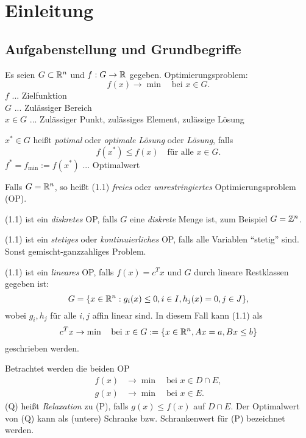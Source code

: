 \section{Einleitung}
\subsection{Aufgabenstellung und Grundbegriffe}
Es seien $G \subset \mathbb{R}^n$ und $f: G \to \mathbb{R}$ gegeben. Optimierungsproblem:
\begin{equation}
  f(x) \to \min \quad \text{bei } x \in G.
\end{equation}
$f$ ... Zielfunktion \\
$G$ ... Zulässiger Bereich \\
$x \in G$ ... Zulässiger Punkt, zulässiges Element, zulässige Lösung

$x^* \in G$  heißt \emph{potimal} oder \emph{optimale Lösung} oder
\emph{Lösung}, falls
\begin{equation}
  f(x^*) \le f(x) \quad \text{für alle } x \in G.
\end{equation}
$f^* = f_{\min} := f(x^*)$ ... Optimalwert

Falls $G = \mathbb{R}^n$, so heißt (1.1) \emph{freies} oder \emph{unrestringiertes}
Optimierungsproblem (OP).

(1.1) ist ein \emph{diskretes} OP, falls $G$ eine
\emph{diskrete} Menge ist, zum Beispiel $G = \mathbb{Z}^n$.

(1.1) ist ein \emph{stetiges} oder \emph{kontinuierliches} OP, falls alle
Variablen ``stetig'' sind. Sonst gemischt-ganzzahliges Problem.

(1.1) ist ein \emph{lineares} OP, falls $f(x) = c^T x$ und $G$ durch lineare
Restklassen gegeben ist:
\begin{equation}
  G = \{ x \in \mathbb{R}^n : g_i(x) \le 0, i \in I, h_j(x) = 0, j \in J \},
\end{equation}
wobei $g_i, h_j$ für alle $i,j$ affin linear sind. In diesem Fall kann (1.1) als
\[ c^T x \to \min \quad \text{bei } x \in G:= \{ x \in \mathbb{R}^n, Ax = a, Bx \le b
  \} \]
geschrieben werden.

\begin{defn}
  Betrachtet werden die beiden OP
  \begin{align*}
    f(x) &\to \min \quad \text{bei } x \in D \cap E, \tag{P} \\
    g(x) &\to \min \quad \text{bei } x \in E. \tag{Q}
  \end{align*}
  (Q) heißt \emph{Relaxation} zu (P), falls $g(x) \le f(x)$ auf $D \cap E$. Der
  Optimalwert von (Q) kann als (untere) Schranke bzw. Schrankenwert für (P)
  bezeichnet werden.
\end{defn}

